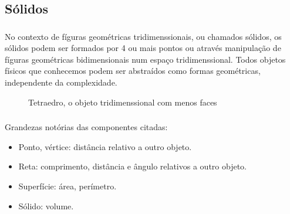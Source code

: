 \documentclass[handout]{beamer}
\begin{document}
\subsection{Sólidos}
\begin{frame}\frametitle{\subsecname}
    No contexto de fíguras geométricas tridimenssionais, ou chamados sólidos, os sólidos podem ser formados por 4 ou
    mais pontos ou através manipulação de fíguras geométricas bidimensionais num espaço tridimenssional.
    Todos objetos físicos que conhecemos podem ser abstraídos como formas geométricas, independente da complexidade.

    \begin{figure}[H]
        \centering
        \caption{Tetraedro, o objeto tridimenssional com menos faces}
    \end{figure}
\end{frame}

\begin{frame}\frametitle{\subsecname}
    Grandezas notórias das componentes citadas:
    \begin{itemize}
        \setlength\itemsep{1.15pt}
        \item Ponto, vértice: distância relativo a outro objeto.
        \item Reta: comprimento, distância e ângulo relativos a outro objeto.
        \item Superfície: área, perímetro.
        \item Sólido: volume.
    \end{itemize}
\end{frame}
\end{document}
